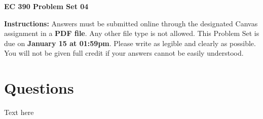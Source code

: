 \documentclass[12pt]{exam}
\newcommand{\examdate}{\fontfamily{lmss} \textbf{January 15 at 01:59pm}}
\begin{document}
\selectfont

\begin{center}
    \textbf{{\LARGE EC 390 Problem Set 04}} \\
    \bigskip 
\end{center}

\noindent \textbf{Instructions:} 
Answers must be submitted online through the designated Canvas assignment in a \textbf{PDF file}.
Any other file type is not allowed. 
This Problem Set is due on \examdate.
Please write as legible and clearly as possible. 
You will not be given full credit if your answers cannot be easily understood. 

\section*{Questions}

\begin{questions}
    
\question 
Text here



\end{questions}
\end{document}

